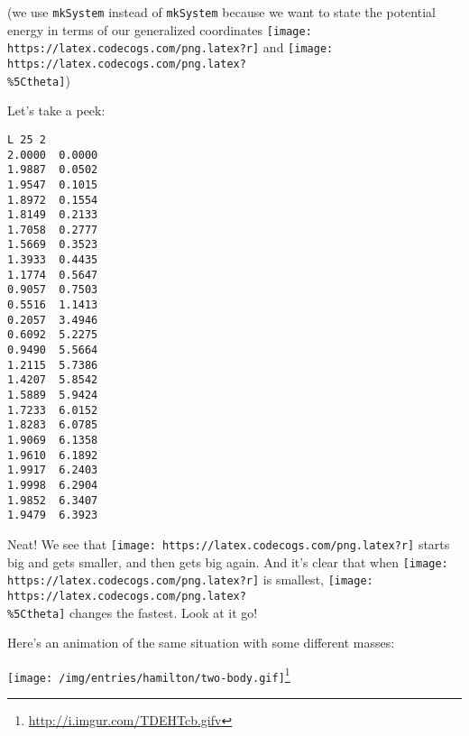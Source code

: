 \documentclass[]{article}
\newenvironment{Shaded}{}{}
\newcommand{\DataTypeTok}[1]{\textcolor[rgb]{0.56,0.13,0.00}{#1}}
\newcommand{\DecValTok}[1]{\textcolor[rgb]{0.25,0.63,0.44}{#1}}
\newcommand{\FloatTok}[1]{\textcolor[rgb]{0.25,0.63,0.44}{#1}}
\newcommand{\CommentTok}[1]{\textcolor[rgb]{0.38,0.63,0.69}{\textit{#1}}}
\newcommand{\OtherTok}[1]{\textcolor[rgb]{0.00,0.44,0.13}{#1}}
\newcommand{\FunctionTok}[1]{\textcolor[rgb]{0.02,0.16,0.49}{#1}}
\newcommand{\NormalTok}[1]{#1}
\renewcommand{\href}[2]{#2\footnote{\url{#1}}}
\begin{document}
(we use \texttt{mkSystem} instead of \texttt{mkSystem\textquotesingle{}} because
we want to state the potential energy in terms of our generalized coordinates
\texttt{[image: https://latex.codecogs.com/png.latex?r]} and
\texttt{[image: https://latex.codecogs.com/png.latex?\\\%5Ctheta]})

Let's take a peek:

\begin{Shaded}
\end{Shaded}

\begin{verbatim}
L 25 2
2.0000  0.0000
1.9887  0.0502
1.9547  0.1015
1.8972  0.1554
1.8149  0.2133
1.7058  0.2777
1.5669  0.3523
1.3933  0.4435
1.1774  0.5647
0.9057  0.7503
0.5516  1.1413
0.2057  3.4946
0.6092  5.2275
0.9490  5.5664
1.2115  5.7386
1.4207  5.8542
1.5889  5.9424
1.7233  6.0152
1.8283  6.0785
1.9069  6.1358
1.9610  6.1892
1.9917  6.2403
1.9998  6.2904
1.9852  6.3407
1.9479  6.3923
\end{verbatim}

Neat! We see that \texttt{[image: https://latex.codecogs.com/png.latex?r]}
starts big and gets smaller, and then gets big again. And it's clear that when
\texttt{[image: https://latex.codecogs.com/png.latex?r]} is smallest,
\texttt{[image: https://latex.codecogs.com/png.latex?\\\%5Ctheta]} changes the
fastest. Look at it go!

Here's an animation of the same situation with some different masses:

\href{http://i.imgur.com/TDEHTcb.gifv}{\texttt{[image: /img/entries/hamilton/two-body.gif]}}
\end{document}

